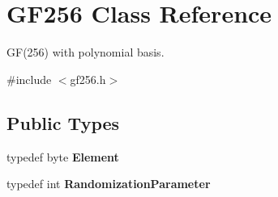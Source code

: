 \hypertarget{class_g_f256}{
\section{GF256 Class Reference}
\label{class_g_f256}
}


GF(256) with polynomial basis.  


{\ttfamily \#include $<$gf256.h$>$}\subsection*{Public Types}
\begin{DoxyCompactItemize}
\item 
\hypertarget{class_g_f256_a61d30f3ae84c0b9f99906f34492842f0}{
typedef byte {\bfseries Element}}
\label{class_g_f256_a61d30f3ae84c0b9f99906f34492842f0}

\item 
\hypertarget{class_g_f256_a074b1b9381b9c60ecf4754453b739beb}{
typedef int {\bfseries RandomizationParameter}}
\label{class_g_f256_a074b1b9381b9c60ecf4754453b739beb}

\end{DoxyCompactItemize}
